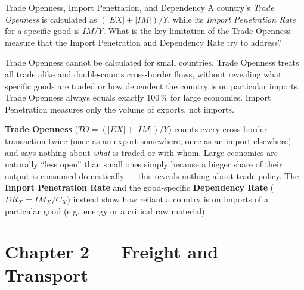 \begin{question}[type=mc]{Trade Openness, Import Penetration, and Dependency}
A country's \emph{Trade Openness} is calculated as $(|EX|+|IM|)/Y$, while
its \emph{Import Penetration Rate} for a specific good is $IM/Y$. What is
the key limitation of the Trade Openness measure that the Import Penetration
and Dependency Rate try to address?
\begin{choices}
  \choice        Trade Openness cannot be calculated for small countries.
  \correctchoice Trade Openness treats all trade alike and double-counts
                 cross-border flows, without revealing what specific goods
                 are traded or how dependent the country is on particular
                 imports.
  \choice        Trade Openness always equals exactly 100\,\% for large
                 economies.
  \choice        Import Penetration measures only the volume of exports, not
                 imports.
\end{choices}
\begin{solution}
  \textbf{Trade Openness} ($TO = (|EX|+|IM|)/Y$) counts every cross-border
  transaction twice (once as an export somewhere, once as an import
  elsewhere) and says nothing about \emph{what} is traded or with whom.
  Large economies are naturally ``less open'' than small ones simply because
  a bigger share of their output is consumed domestically --- this reveals
  nothing about trade policy. The \textbf{Import Penetration Rate} and the
  good-specific \textbf{Dependency Rate} ($DR_X = IM_X/C_X$) instead show how
  reliant a country is on imports of a particular good (e.g.\ energy or a
  critical raw material).
\end{solution}
\end{question}


\section{Chapter 2 — Freight and Transport}

